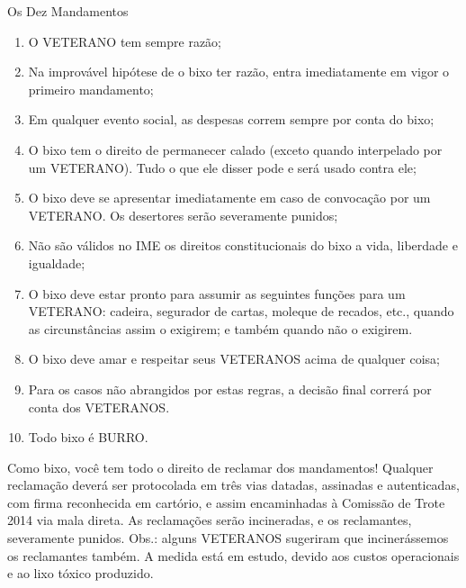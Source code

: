 \begin{editorial}{Os Dez Mandamentos}
  \begin{enumerate}
  \item O VETERANO tem sempre razão;
  \item Na improvável hipótese de o bixo ter razão, entra imediatamente
        em vigor o primeiro mandamento;
  \item Em qualquer evento social, as despesas correm sempre por conta
        do bixo;
  \item O bixo tem o direito de permanecer calado (exceto quando interpelado
        por um VETERANO). Tudo o que ele disser pode e será usado contra ele;
  \item O bixo deve se apresentar imediatamente em caso de convocação por
        um VETERANO. Os desertores serão severamente punidos;
  \item Não são válidos no IME os direitos constitucionais do bixo a vida,
        liberdade e igualdade;
  \item O bixo deve estar pronto para assumir as seguintes funções para um
        VETERANO: cadeira, segurador de cartas, moleque de recados, etc., quando
        as circunstâncias assim o exigirem; e também quando não o exigirem.
  \item O bixo deve amar e respeitar seus VETERANOS acima de qualquer
        coisa;
  \item Para os casos não abrangidos por estas regras, a decisão final
        correrá por conta dos VETERANOS.
  \item Todo bixo é BURRO.
  \end{enumerate}


Como bixo, você tem todo o direito de reclamar dos mandamentos! Qualquer
reclamação deverá ser protocolada em três vias datadas, assinadas e autenticadas,
com firma reconhecida em cartório, e assim encaminhadas à Comissão de Trote 2014 %
via mala direta. As reclamações serão incineradas, e os reclamantes, severamente
punidos. Obs.: alguns VETERANOS sugeriram que incinerássemos os reclamantes também.
A medida está em estudo, devido aos custos operacionais e ao lixo tóxico produzido.

\thispagestyle{empty}
\end{editorial}
